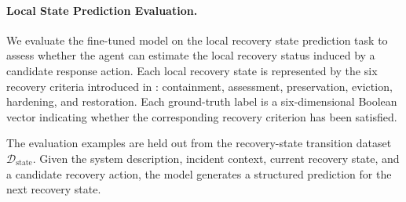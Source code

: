 \documentclass[sigconf]{acmart}
\begin{document}
\begin{table}[t]
    \caption{Per-tactic MITRE ATT\&CK generation metrics on held-out incident assessment examples.}
    \label{tab:per-tactic}
\end{table}



\paragraph{Local State Prediction Evaluation.}
We evaluate the fine-tuned model on the local recovery state prediction task to assess whether the agent can estimate the local recovery status induced by a candidate response action. Each local recovery state is represented by the six recovery criteria introduced in : containment, assessment, preservation, eviction,
hardening, and restoration. Each ground-truth label is a six-dimensional Boolean vector indicating whether the corresponding recovery criterion has been satisfied.

The evaluation examples are held out from the recovery-state transition dataset $\mathcal{D}_{\mathrm{state}}$. Given the system description, incident context,
current recovery state, and a candidate recovery action, the model generates a structured prediction for the next recovery state.
\end{document}
